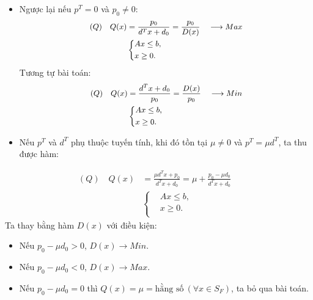 \documentclass{beamer}
\begin{document}
\begin{frame}
\begin{itemize}
\item Ngược lại nếu $p^T=0$ và $p_0 \neq 0$:
\begin{equation} \small \label{Q}
    \begin{split}
    (Q) \quad Q(x) & = \frac{p_0}{d^Tx+d_0} = \frac{p_0}{D(x)} \quad \longrightarrow Max \\
        & \left\{
        \begin{split}
        &Ax \leq  b, \\
        &x \geq 0. \\
        \end{split}
        \right.    
    \end{split}
\end{equation}
Tương tự bài toán:
\begin{equation} \small \label{Q}
    \begin{split}
    (Q) \quad Q(x) & = \frac{d^Tx+d_0}{p_0} = \frac{D(x)}{p_0} \quad \longrightarrow Min \\
        & \left\{
        \begin{split}
        &Ax \leq  b, \\
        &x \geq 0. \\
        \end{split}
        \right.    
    \end{split}
\end{equation}
\item Nếu $p^T$ và $d^T$ phụ thuộc tuyến tính, khi đó tồn tại $\mu \neq 0$ và $p^T=\mu d^T$, ta thu được hàm:
\end{itemize}
\end{frame}
\begin{frame} \large
\begin{equation} \label{Q}
    \begin{split}
    (Q) \quad Q(x) & = \frac{\mu d^Tx + p_0}{d^Tx+d_0} = \mu + \frac{p_0-\mu d_0}{d^Tx+d_0} \quad \\
        & \left\{
        \begin{split}
        &Ax \leq  b, \\
        &x \geq 0. \\
        \end{split}
        \right.    
    \end{split}
\end{equation}
Ta thay bằng hàm $D(x)$ với điều kiện:
\begin{itemize}
\item Nếu $p_0 - \mu d_0 > 0$, $D(x) \longrightarrow Min$.
\item Nếu $p_0 - \mu d_0 < 0$, $D(x) \longrightarrow Max$.
\item Nếu $p_0 - \mu d_0 = 0$ thì $Q(x)=\mu= \text{hằng số} \: (\forall x \in S_F)$, ta bỏ qua bài toán.
\end{itemize}
\end{frame}
\end{document}
